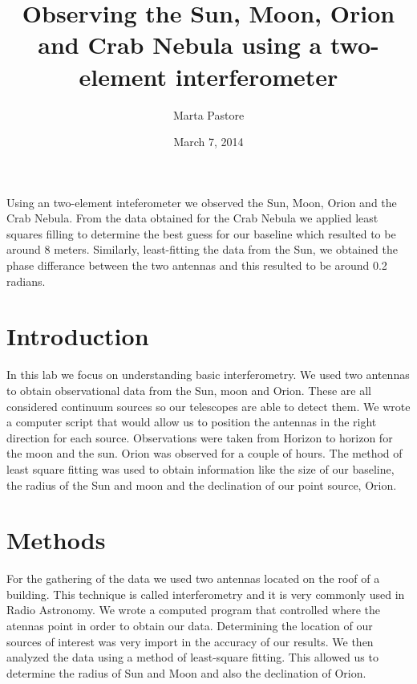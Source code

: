 \documentclass[12pt]{article}
\begin{document}
\title {Observing the Sun, Moon, Orion and Crab Nebula using a
  two-element interferometer}
\author {Marta Pastore}
\date {March 7, 2014}
\maketitle

\begin {abstract}


\end {abstract}
Using an two-element inteferometer we observed the Sun, Moon, Orion and
the Crab Nebula. From the data obtained for the Crab Nebula we applied
least squares filling to determine the best guess for our baseline which
resulted to be around 8 meters. Similarly, least-fitting the data from
the Sun, we obtained the phase differance between the two antennas and
this resulted to be around 0.2 radians. 

\section {Introduction}

In this lab we focus on understanding basic interferometry.  We used two
antennas to obtain observational data from the Sun, moon and
Orion. These are all considered continuum sources so our telescopes are
able to detect them. We wrote a computer script that would allow us to
position the antennas in the right direction for each
source. Observations were taken from Horizon to horizon for the moon and
the sun. Orion was observed for a couple of hours. The method of least
square fitting was used to obtain information like the size of our
baseline, the radius of the Sun and moon and the declination of our
point source, Orion. 

\section {Methods}

For the gathering of the data we used two antennas located on the roof of
a building. This technique is called interferometry and it is very
commonly used in Radio Astronomy. We wrote a computed program that
controlled where the atennas point in order to obtain our
data. Determining the location of our sources of interest was very
import in the accuracy of our results. We then analyzed the data using a
method of least-square fitting. This allowed us to determine the radius
of Sun and Moon and also the declination of Orion. 
\end{document}
